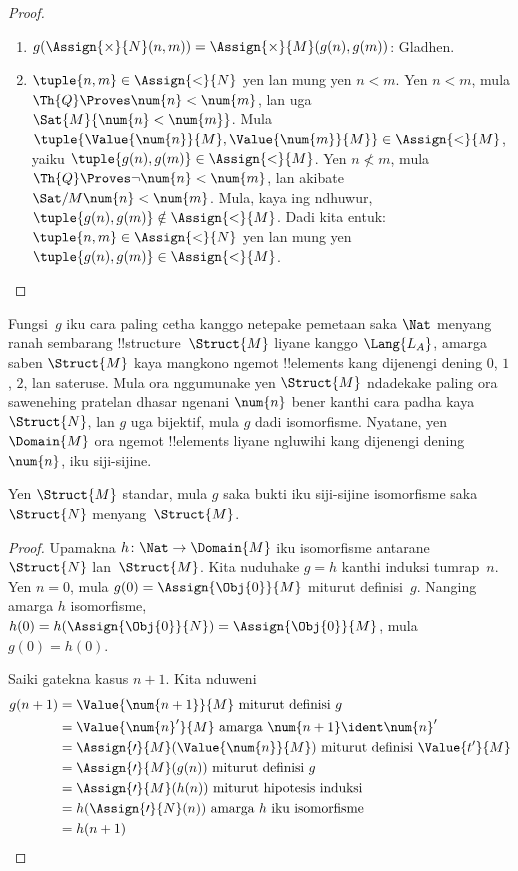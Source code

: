 \documentclass[../../../include/open-logic-section]{subfiles}
\begin{document}
\begin{proof}
\begin{enumerate}
\item $g(\Assign{\times}{N}(n, m)) =
  \Assign{\times}{M}(g(n), g(m))$:
  Gladhen.
\item $\tuple{n,m} \in
  \Assign{<}{N}$ yen lan mung yen
  $n < m$. Yen $n < m$,
  mula $\Th{Q} \Proves
  \num{n} < \num{m}$,
  lan uga $\Sat{M}{\num{n} <
  \num{m}}$.
  Mula $\tuple{
  \Value{\num{n}}{M},
  \Value{\num{m}}{M}} \in
  \Assign{<}{M}$,
  yaiku $\tuple{g(n), g(m)}
  \in \Assign{<}{M}$.
  Yen $n
  \not< m$,
  mula $\Th{Q} \Proves
  \lnot \num{n} < \num{m}$,
  lan akibate
  $\Sat/{M}{\num{n} < \num{m}}$.
  Mula, kaya ing ndhuwur,
  $\tuple{g(n), g(m)} \notin
  \Assign{<}{M}$.
  Dadi kita entuk:
  $\tuple{n,m} \in
  \Assign{<}{N}$ yen lan mung yen
  $\tuple{g(n), g(m)} \in
  \Assign{<}{M}$.
\end{enumerate}
\end{proof}

\begin{explain}
Fungsi~$g$ iku cara
paling cetha kanggo
netepake pemetaan saka
$\Nat$ menyang ranah
sembarang !!{structure}~$\Struct{M}$
liyane kanggo
$\Lang{L_A}$, amarga
saben $\Struct{M}$
kaya mangkono ngemot
!!{element}s kang dijenengi
dening $\num{0}$,
$\num{1}$, $\num{2}$,
lan sateruse.
Mula ora nggumunake yen
$\Struct{M}$ ndadekake
paling ora sawenehing
pratelan dhasar ngenani
$\num{n}$ bener
kanthi cara padha
kaya~$\Struct{N}$,
lan $g$ uga bijektif,
mula $g$ dadi isomorfisme.
Nyatane, yen
$\Domain{M}$ ora ngemot
!!{element}s liyane
ngluwihi kang dijenengi
dening $\num{n}$,
iku siji-sijine.
\end{explain}

\begin{prop}
Yen $\Struct{M}$ standar,
mula $g$ saka bukti
iku siji-sijine isomorfisme
saka $\Struct{N}$
menyang~$\Struct{M}$.
\end{prop}

\begin{proof}
Upamakna $h\colon
\Nat \to \Domain{M}$
iku isomorfisme
antarane $\Struct{N}$
lan~$\Struct{M}$.
Kita nuduhake $g = h$
kanthi induksi tumrap~$n$.
Yen $n = 0$, mula
$g(0) = \Assign{\Obj{0}}{M}$
miturut definisi~$g$.
Nanging amarga $h$
isomorfisme,
$h(0) =
h(\Assign{\Obj{0}}{N}) =
\Assign{\Obj{0}}{M}$,
mula $g(0) = h(0)$.

Saiki gatekna kasus
$n+1$. Kita nduweni
\begin{align*}
  g(n+1) & = \Value{\num{n+1}}{M} \text{ miturut definisi~$g$}\\
  & = \Value{\num{n}'}{M} \text{ amarga $\num{n+1}\ident \num{n}'$}\\
  & = \Assign{\prime}{M}(\Value{\num{n}}{M})
    \text{ miturut definisi $\Value{t'}{M}$}\\
  & = \Assign{\prime}{M}(g(n))  \text{ miturut definisi~$g$}\\
  & = \Assign{\prime}{M}(h(n)) \text{ miturut hipotesis induksi}\\
  & = h(\Assign{\prime}{N}(n)) \text{ amarga $h$ iku isomorfisme}\\
  & = h(n+1)
\end{align*}
\end{proof}
\end{document}
